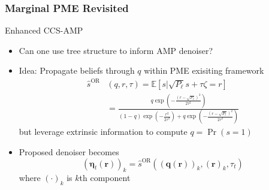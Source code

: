 \documentclass[10pt]{beamer}
\begin{document}
\begin{frame}
\frametitle{Marginal PME Revisited}
\begin{block}{Enhanced CCS-AMP}
\begin{itemize}
\item Can one use tree structure to inform AMP denoiser?
\item Idea: Propagate beliefs through $q$ within PME exisiting framework
\begin{equation*}
\begin{split}
\hat{s}^{\mathrm{OR}} & \left( q, r, \tau \right)
= \mathbb{E} \left[ s | \sqrt{P_{\ell}} s + \tau \zeta = r \right] \\
&= \textstyle \frac{q \exp \left( - \frac{ \left( r - \sqrt{P_{\ell}} \right)^2}{2 \tau^2} \right)}
{(1-q) \exp \left( -\frac{r^2}{2 \tau^2} \right)
+ q \exp \left( - \frac{ \left( r - \sqrt{P_{\ell}} \right)^2}{2 \tau^2} \right)}
\end{split}
\end{equation*}
but leverage extrinsic information to compute $q = \Pr (s = 1)$
\item Proposed denoiser becomes
\begin{equation*}
\left( \boldsymbol{\eta}_t \left( \mathbf{r} \right) \right)_k
= \hat{s}^{\mathrm{OR}} \left( \left( \mathbf{q} \left( \mathbf{r} \right) \right)_k, \left( \mathbf{r} \right)_k, \tau_t \right)
\end{equation*}
where $( \cdot )_k$ is $k$th component
\end{itemize}
\end{block}
\end{frame}
\end{document}
